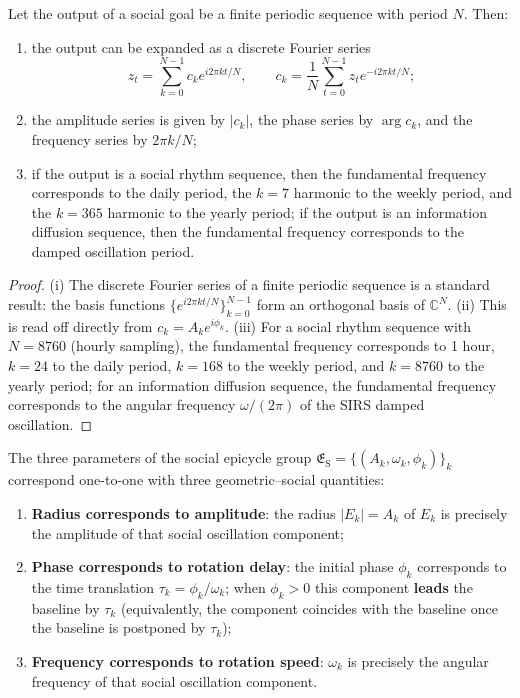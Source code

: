 \begin{theorem}\label{thm:social_series_reconstruction}
Let the output of a social goal be a finite periodic sequence with period $N$. Then:
\begin{enumerate}[label=(\roman*)]
    \item the output can be expanded as a discrete Fourier series
    \[
    z_t=\sum_{k=0}^{N-1}c_k e^{i2\pi kt/N},\qquad
    c_k=\frac1N\sum_{t=0}^{N-1}z_t e^{-i2\pi kt/N};
    \]
    \item the amplitude series is given by $|c_k|$, the phase series by $\arg c_k$, and the frequency series by $2\pi k/N$;
    \item if the output is a social rhythm sequence, then the fundamental frequency corresponds to the daily period, the $k=7$ harmonic to the weekly period, and the $k=365$ harmonic to the yearly period; if the output is an information diffusion sequence, then the fundamental frequency corresponds to the damped oscillation period.
\end{enumerate}
\end{theorem}

\begin{proof}
(i) The discrete Fourier series of a finite periodic sequence is a standard result: the basis functions $\{e^{i2\pi kt/N}\}_{k=0}^{N-1}$ form an orthogonal basis of $\mathbb C^N$.
(ii) This is read off directly from $c_k=A_k e^{i\phi_k}$.
(iii) For a social rhythm sequence with $N=8760$ (hourly sampling), the fundamental frequency corresponds to 1 hour, $k=24$ to the daily period, $k=168$ to the weekly period, and $k=8760$ to the yearly period; for an information diffusion sequence, the fundamental frequency corresponds to the angular frequency $\omega/(2\pi)$ of the SIRS damped oscillation.
\end{proof}

\begin{proposition}\label{prop:social_epicycle_correspondence}
The three parameters of the social epicycle group $\mathfrak E_{\mathrm{S}}=\{(A_k,\omega_k,\phi_k)\}_{k}$ correspond one-to-one with three geometric--social quantities:
\begin{enumerate}[label=(\roman*)]
    \item \textbf{Radius corresponds to amplitude}: the radius $|E_k|=A_k$ of $E_k$ is precisely the amplitude of that social oscillation component;
    \item \textbf{Phase corresponds to rotation delay}: the initial phase $\phi_k$ corresponds to the time translation $\tau_k=\phi_k/\omega_k$; when $\phi_k>0$ this component \textbf{leads} the baseline by $\tau_k$ (equivalently, the component coincides with the baseline once the baseline is postponed by $\tau_k$);
    \item \textbf{Frequency corresponds to rotation speed}: $\omega_k$ is precisely the angular frequency of that social oscillation component.
\end{enumerate}
\end{proposition}

